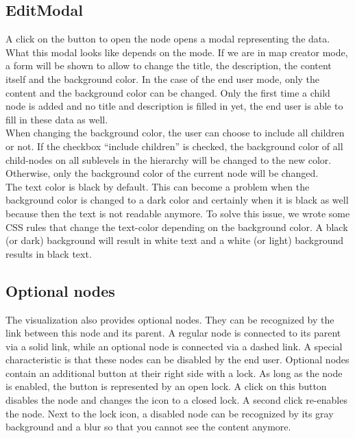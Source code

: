 \subsection{EditModal}
A click on the button to open the node opens a modal representing the data. What this modal looks like depends on the mode. If we are in map creator mode, a form will be shown to allow to change the title, the description, the content itself and the background color. In the case of the end user mode, only the content and the background color can be changed. Only the first time a child node is added and no title and description is filled in yet, the end user is able to fill in these data as well.\\

When changing the background color, the user can choose to include all children or not. If the checkbox ``include children'' is checked, the background color of all child-nodes on all sublevels in the hierarchy will be changed to the new color. Otherwise, only the background color of the current node will be changed.\\

The text color is black by default. This can become a problem when the background color is changed to a dark color and certainly when it is black as well because then the text is not readable anymore. To solve this issue, we wrote some CSS rules that change the text-color depending on the background color. A black (or dark) background will result in white text and a white (or light) background results in black text.
 


\subsection{Optional nodes}
The visualization also provides optional nodes. They can be recognized by the link between this node and its parent. A regular node is connected to its parent via a solid link, while an optional node is connected via a dashed link. A special characteristic is that these nodes can be disabled by the end user. Optional nodes contain an additional button at their right side with a lock. As long as the node is enabled, the button is represented by an open lock. A click on this button disables the node and changes the icon to a closed lock. A second click re-enables the node. Next to the lock icon, a disabled node can be recognized by its gray background and a blur so that you cannot see the content anymore.














